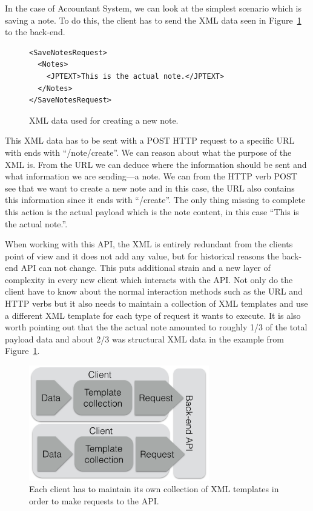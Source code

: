 \documentclass{cslthse-msc}
\begin{document}
In the case of Accountant System, we can look at the simplest scenario which is saving a note. To do this, the client has to send the XML data seen in Figure~\ref{fig:xml_account_example} to the back-end.

\begin{figure}[H]
  \centering
    \begin{center}
\begin{lstlisting}[breaklines=true,frame=single]
<SaveNotesRequest>
  <Notes>
    <JPTEXT>This is the actual note.</JPTEXT>
  </Notes>
</SaveNotesRequest>
\end{lstlisting}
    \end{center}
  \caption{XML data used for creating a new note.}
  \label{fig:xml_account_example}
\end{figure}


This XML data has to be sent with a POST HTTP request to a specific URL with ends with \enquote{/note/create}. We can reason about what the purpose of the XML is. From the URL we can deduce where the information should be sent and what information we are sending---a note. We can from the HTTP verb POST see that we want to create a new note and in this case, the URL also contains this information since it ends with \enquote{/create}. The only thing missing to complete this action is the actual payload which is the note content, in this case \enquote{This is the actual note.}.

When working with this API, the XML is entirely redundant from the clients point of view and it does not add any value, but for historical reasons the back-end API can not change. This puts additional strain and a new layer of complexity in every new client which interacts with the API. Not only do the client have to know about the normal interaction methods such as the URL and HTTP verbs but it also needs to maintain a collection of XML templates and use a different XML template for each type of request it wants to execute. It is also worth pointing out that the the actual note amounted to roughly 1/3 of the total payload data and about 2/3 was structural XML data in the example from Figure~\ref{fig:xml_account_example}.

\begin{figure}[H]
  \centering
    \begin{center}
      \includegraphics[width=0.7\textwidth]{images/client_templates.png}
    \end{center}
  \caption{Each client has to maintain its own collection of XML templates in order to make requests to the API.}
\end{figure}
\end{document}

